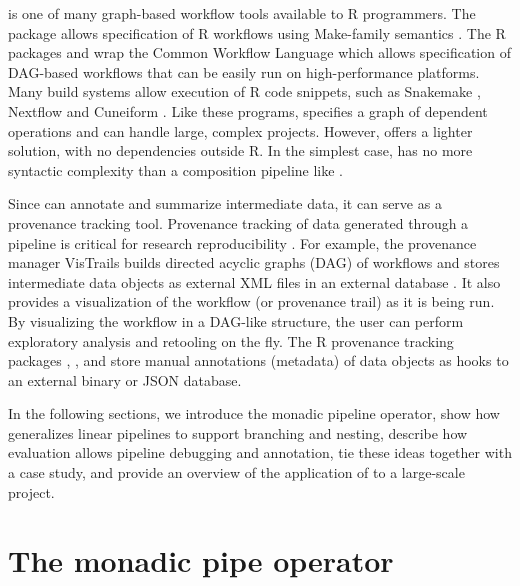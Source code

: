  is one of many graph-based workflow tools available to R
programmers. The  package \citep{drake} allows specification of
R workflows using Make-family semantics \citep{stallman2002gnu}. The R packages
 \citep{tidycwl2020} and 
\citep{sevenbridges2020} wrap the Common Workflow Language which allows
specification of DAG-based workflows that can be easily run on high-performance
platforms. Many build systems allow execution of R code snippets, such as
Snakemake \citep{koster2012snakemake}, Nextflow \citep{di2017nextflow} and
Cuneiform \citep{brandt2017computation}. Like these programs, 
specifies a graph of dependent operations and can handle large, complex
projects. However,  offers a lighter solution, with no
dependencies outside R.  In the simplest case,  has no more
syntactic complexity than a composition pipeline like .

Since  can annotate and summarize intermediate data, it can
serve as a provenance tracking tool. Provenance tracking of data generated
through a pipeline is critical for research reproducibility
\citep{Gentleman2007StatisticalAA}. For example, the provenance manager
VisTrails builds directed acyclic graphs (DAG) of workflows and stores
intermediate data objects as external XML files in an external database
\citep{Silva2010ProvenanceEnabledDE}. It also provides a visualization of the
workflow (or provenance trail) as it is being run. By visualizing the workflow
in a DAG-like structure, the user can perform exploratory analysis and
retooling on the fly. The R provenance tracking packages 
\citep{przemyslaw2017archivist},  \citep{becker2019trackr}, and
 \citep{Gelfond2018ASF} store manual annotations (metadata) of
data objects as hooks to an external binary or JSON database.

In the following sections, we introduce the  monadic pipeline
operator, show how  generalizes linear pipelines to support branching
and nesting, describe how  evaluation allows pipeline debugging
and annotation, tie these ideas together with a case study, and provide an
overview of the application of  to a large-scale project.

\section{The monadic pipe operator}

